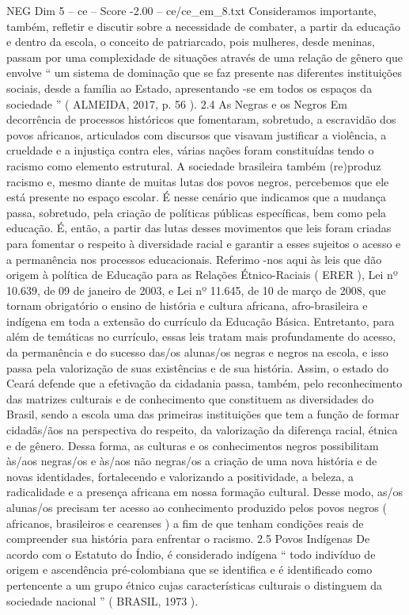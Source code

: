 \begin{textsample}{NEG Dim 5 – ce – Score -2.00 – ce/ce\_em\_8.txt}
Consideramos importante, também, refletir e discutir sobre a necessidade de combater, a partir da educação e dentro da escola, o conceito de patriarcado, pois mulheres, desde meninas, passam por uma complexidade de situações através de uma relação de gênero que envolve “ um sistema de dominação que se faz presente nas diferentes instituições sociais, desde a família ao Estado, apresentando -se em todos os espaços da sociedade ” ( ALMEIDA, 2017, p. 56 ). 2.4 As Negras e os Negros Em decorrência de processos históricos que fomentaram, sobretudo, a escravidão dos povos africanos, articulados com discursos que visavam justificar a violência, a crueldade e a injustiça contra eles, várias nações foram constituídas tendo o racismo como elemento estrutural.
A sociedade brasileira também (re)produz racismo e, mesmo diante de muitas lutas dos povos negros, percebemos que ele está presente no espaço escolar.
É nesse cenário que indicamos que a mudança passa, sobretudo, pela criação de políticas públicas específicas, bem como pela educação.
É, então, a partir das lutas desses movimentos que leis foram criadas para fomentar o respeito à diversidade racial e garantir a esses sujeitos o acesso e a permanência nos processos educacionais.
Referimo -nos aqui às leis que dão origem à política de Educação para as Relações Étnico-Raciais ( ERER ), Lei nº 10.639, de 09 de janeiro de 2003, e Lei nº 11.645, de 10 de março de 2008, que tornam obrigatório o ensino de história e cultura africana, afro-brasileira e indígena em toda a extensão do currículo da Educação Básica.
Entretanto, para além de temáticas no currículo, essas leis tratam mais profundamente do acesso, da permanência e do sucesso das/os alunas/os negras e negros na escola, e isso passa pela valorização de suas existências e de sua história.
Assim, o estado do Ceará defende que a efetivação da cidadania passa, também, pelo reconhecimento das matrizes culturais e de conhecimento que constituem as diversidades do Brasil, sendo a escola uma das primeiras instituições que tem a função de formar cidadãs/ãos na perspectiva do respeito, da valorização da diferença racial, étnica e de gênero.
Dessa forma, as culturas e os conhecimentos negros possibilitam às/aos negras/os e às/aos não negras/os a criação de uma nova história e de novas identidades, fortalecendo e valorizando a positividade, a beleza, a radicalidade e a presença africana em nossa formação cultural.
Desse modo, as/os alunas/os precisam ter acesso ao conhecimento produzido pelos povos negros ( africanos, brasileiros e cearenses ) a fim de que tenham condições reais de compreender sua história para enfrentar o racismo. 2.5 Povos Indígenas De acordo com o Estatuto do Índio, é considerado indígena “ todo indivíduo de origem e ascendência pré-colombiana que se identifica e é identificado como pertencente a um grupo étnico cujas características culturais o distinguem da sociedade nacional ” ( BRASIL, 1973 ).

\end{textsample}
